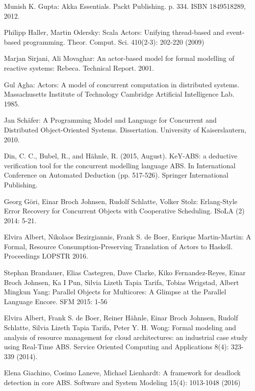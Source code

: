 \documentclass[sigplan,10pt,review,anonymous]{acmart}\settopmatter{printfolios=true}
\begin{document}
	\begin{thebibliography}{4}
	
	  Munish K. Gupta:  Akka Essentials. Packt Publishing. p. 334. ISBN 1849518289, 2012.
	
	
	 Philipp Haller, Martin Odersky:
	Scala Actors: Unifying thread-based and event-based programming. Theor. Comput. Sci. 410(2-3): 202-220 (2009)
	
	 Marjan  Sirjani, Ali Movaghar:
	An actor-based model for formal modelling of reactive systems: Rebeca.
	Technical Report. 2001.
	
	  Gul Agha: Actors: A model of concurrent computation in distributed systems. Massachusetts Institute of Technology Cambridge Artificial Intelligence Lab.
	1985.
	
	 Jan Sch\"{a}fer:  A Programming Model and Language for Concurrent and Distributed Object-Oriented Systems. 
	Dissertation. University of Kaiserslautern, 2010. 
	
	Din, C. C., Bubel, R., and Hähnle, R. (2015, August). KeY-ABS: a deductive verification tool for the concurrent modelling language ABS. In International Conference on Automated Deduction (pp. 517-526). Springer International Publishing.
	
	Georg G\"{o}ri, Einar Broch Johnsen, Rudolf Schlatte, Volker Stolz:
	Erlang-Style Error Recovery for Concurrent Objects with Cooperative Scheduling. ISoLA (2) 2014: 5-21.
	
	 	Elvira Albert, Nikolaos Bezirgiannis, Frank S. de Boer, Enrique Martin-Martin:
	A Formal, Resource Consumption-Preserving Translation of Actors to Haskell. 
	Proceedings LOPSTR 2016.
	
	Stephan Brandauer, Elias Castegren, Dave Clarke, Kiko Fernandez-Reyes, Einar Broch Johnsen, Ka I Pun, Silvia Lizeth Tapia Tarifa, Tobias Wrigstad, Albert Mingkun Yang:
	Parallel Objects for Multicores: A Glimpse at the Parallel Language Encore. SFM 2015: 1-56
	
	Elvira Albert, Frank S. de Boer, Reiner Hähnle, Einar Broch Johnsen, Rudolf Schlatte, Silvia Lizeth Tapia Tarifa, Peter Y. H. Wong:
	Formal modeling and analysis of resource management for cloud architectures: an industrial case study using Real-Time ABS. Service Oriented Computing and Applications 8(4): 323-339 (2014).
	
	Elena Giachino, Cosimo Laneve, Michael Lienhardt:
	A framework for deadlock detection in core ABS. Software and System Modeling 15(4): 1013-1048 (2016)
	

\end{thebibliography}
\end{document}
